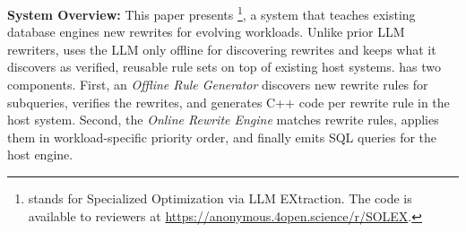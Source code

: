 \textbf{System Overview:} This paper presents {\sys}\footnote{{\sys} stands for Specialized Optimization via LLM EXtraction. The code is available to reviewers at \url{https://anonymous.4open.science/r/SOLEX}.}, a system that teaches existing database engines new rewrites for evolving workloads.
Unlike prior LLM rewriters, {\sys} uses the LLM only offline for discovering rewrites and keeps what it discovers as verified, reusable rule sets on top of existing host systems.
{\sys} has two components. First, an \emph{Offline Rule Generator} discovers new rewrite rules for subqueries, verifies the rewrites, and generates C++ code per rewrite rule in the host system. Second, the \emph{Online Rewrite Engine} matches rewrite rules, applies them in workload-specific priority order, and finally emits SQL queries for the host engine.



